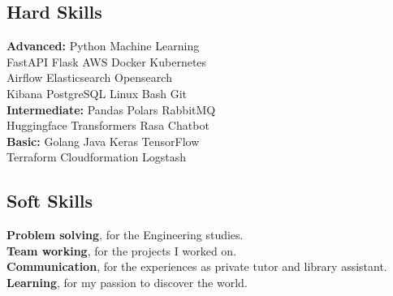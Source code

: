 \documentclass[]{deedy-resume-openfont}
\begin{document}
\begin{minipage}[t]{0.33\textwidth}
\subsection{Hard Skills}
\textbf{Advanced:} Python \textbullet{} Machine Learning \\
FastAPI \textbullet{} Flask \textbullet{} AWS \textbullet{} Docker \textbullet{} Kubernetes \\
Airflow \textbullet{} Elasticsearch \textbullet{} Opensearch \\
Kibana \textbullet{} PostgreSQL \textbullet{} Linux \textbullet{} Bash \textbullet{} Git \\
\textbf{Intermediate:} Pandas \textbullet{} Polars \textbullet{} RabbitMQ \\
Huggingface Transformers \textbullet{} Rasa Chatbot \\
\textbf{Basic:} Golang \textbullet{} Java \textbullet{} Keras \textbullet{} TensorFlow \\
Terraform \textbullet{} Cloudformation \textbullet{} Logstash

\sectionsep

\subsection{Soft Skills}
\textbf{Problem solving}, for the Engineering studies.\\
\textbf{Team working}, for the projects I worked on.\\
\textbf{Communication}, for the experiences as private tutor and library assistant.\\
\textbf{Learning}, for my passion to discover the world.





\end{minipage}
\end{document}
